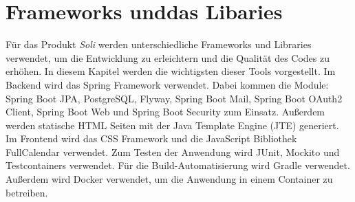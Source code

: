 \chapter{Frameworks unddas Libaries}
\label{ch:frameworks_libaries}

Für das Produkt \textit{Soli} werden unterschiedliche Frameworks und Libraries verwendet, um die Entwicklung zu erleichtern und die Qualität des Codes zu erhöhen. In diesem Kapitel werden die wichtigsten dieser Tools vorgestellt.
Im Backend wird das Spring Framework verwendet. Dabei kommen die Module: Spring Boot JPA, PostgreSQL, Flyway, Spring Boot Mail, Spring Boot OAuth2 Client, Spring Boot Web und Spring Boot Security zum Einsatz. Außerdem werden statische \gls{HTML} Seiten mit der Java Template Engine (JTE) generiert. Im Frontend wird das \gls{CSS} Framework und die JavaScript Bibliothek \gls{FullCalendar} verwendet.
Zum Testen der Anwendung wird JUnit, Mockito und Testcontainers verwendet.
Für die Build-Automatisierung wird Gradle verwendet.
Außerdem wird Docker verwendet, um die Anwendung in einem Container zu betreiben.